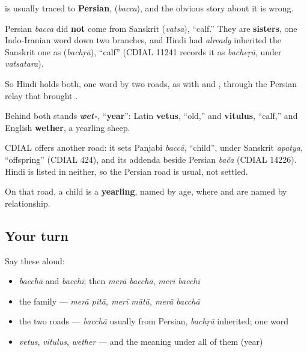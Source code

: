 \begin{cousinweb}
\textbf{} is usually traced to \textbf{Persian}, \textbf{} (\emph{bacca}), and the obvious story about it is wrong.

Persian \emph{bacca} did \textbf{not} come from Sanskrit \textbf{} (\emph{vatsa}), \textquotedblleft{}calf.\textquotedblright{} They are \textbf{sisters}, one Indo-Iranian word down two branches, and Hindi had \emph{already} inherited the Sanskrit one as \textbf{} (\emph{bachṛā}), \textquotedblleft{}calf\textquotedblright{} (CDIAL 11241 records it as \emph{bacheṛā}, under \emph{vatsatara}).

So Hindi holds both, one word by two roads, as with \textbf{} and \textbf{}, through the Persian relay that brought \textbf{}.

Behind both stands \emph{\textbf{wet-}}, \textquotedblleft{}\textbf{year}\textquotedblright{}: Latin \textbf{vetus}, \textquotedblleft{}old,\textquotedblright{} and \textbf{vitulus}, \textquotedblleft{}calf,\textquotedblright{} and English \textbf{wether}, a yearling sheep.

CDIAL offers another road: it sets Panjabi \emph{baccā}, \textquotedblleft{}child\textquotedblright{}, under Sanskrit \emph{apatya}, \textquotedblleft{}offspring\textquotedblright{} (CDIAL 424), and its addenda beside Persian \emph{bača} (CDIAL 14226). Hindi is listed in neither, so the Persian road is usual, not settled.

On that road, a child is a \textbf{yearling}, named by age, where \textbf{} and \textbf{} are named by relationship.
\end{cousinweb}

\subsection*{Your turn}
Say these aloud:

\begin{itemize}
\raggedright
  \item \emph{bacchā} and \emph{bacchī}; then \emph{merā bacchā}, \emph{merī bacchī}
  \item the family — \emph{merā pitā, merī mātā, merā bacchā}
  \item the two roads — \emph{bacchā} usually from Persian, \emph{bachṛā} inherited; one word
  \item \emph{vetus}, \emph{vitulus}, \emph{wether} — and the meaning under all of them (year)
\end{itemize}

